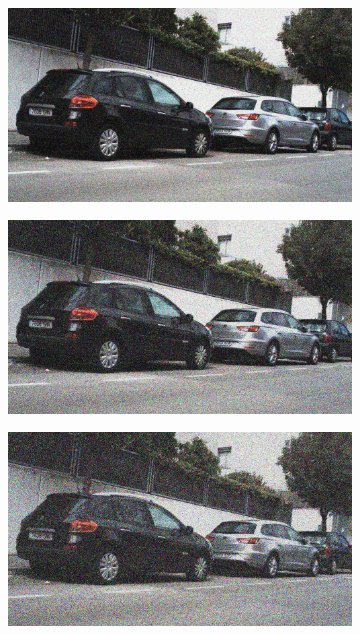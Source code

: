 \documentclass[a4paper]{ctexart}
\begin{document}
\begin{figure}[htbp]
\begin{subfigure}{0.08\textwidth}
				\label{fig：Gamma=0.5, Gauss Noise = 0.1}
			\end{subfigure}
			\begin{subfigure}{0.08\textwidth}
				\captionsetup{font=scriptsize}
				\includegraphics[width=\linewidth]{picture/Edge Detection/degrade/RGB_001 Gamma=0.5, Gauss Noise=0.2}
				\label{fig：Gamma=0.5, Gauss Noise = 0.2}
			\end{subfigure}
			\begin{subfigure}{0.08\textwidth}
				\captionsetup{font=scriptsize}
				\includegraphics[width=\linewidth]{picture/Edge Detection/degrade/RGB_001 Gamma=0.5, Gauss Noise=0.3}
				\label{fig：Gamma=0.5, Gauss Noise = 0.3}
			\end{subfigure}
			\begin{subfigure}{0.08\textwidth}
				\captionsetup{font=scriptsize}
				\includegraphics[width=\linewidth]{picture/Edge Detection/degrade/RGB_001 Gamma=0.5, Gauss Noise=0.4}

\end{subfigure}
\end{figure}
\end{document}
